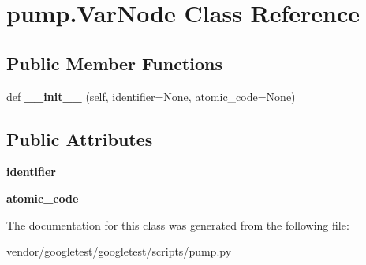 \hypertarget{classpump_1_1VarNode}{}\section{pump.\+Var\+Node Class Reference}
\label{classpump_1_1VarNode}
\subsection*{Public Member Functions}
\begin{DoxyCompactItemize}
\item 
def {\bfseries \+\_\+\+\_\+init\+\_\+\+\_\+} (self, identifier=None, atomic\+\_\+code=None)\hypertarget{classpump_1_1VarNode_adf79bf21b1db5367792a4ac91f94a756}{}\label{classpump_1_1VarNode_adf79bf21b1db5367792a4ac91f94a756}

\end{DoxyCompactItemize}
\subsection*{Public Attributes}
\begin{DoxyCompactItemize}
\item 
{\bfseries identifier}\hypertarget{classpump_1_1VarNode_aa2b634e2443646c3754f2d193efa4dc7}{}\label{classpump_1_1VarNode_aa2b634e2443646c3754f2d193efa4dc7}

\item 
{\bfseries atomic\+\_\+code}\hypertarget{classpump_1_1VarNode_ad6bef6a8577b994fbe9ccddf3c82d2fc}{}\label{classpump_1_1VarNode_ad6bef6a8577b994fbe9ccddf3c82d2fc}

\end{DoxyCompactItemize}


The documentation for this class was generated from the following file\+:\begin{DoxyCompactItemize}
\item 
vendor/googletest/googletest/scripts/pump.\+py\end{DoxyCompactItemize}
